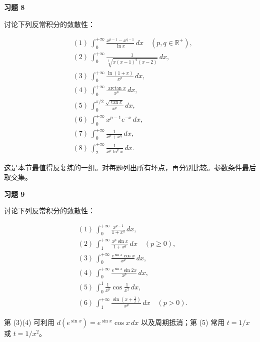 \begin{exercisebox}
\textbf{习题 8 }

讨论下列反常积分的敛散性：

\[
      \begin{aligned}
      &(1)\ \int_0^{+\infty}\frac{x^{p-1}-x^{q-1}}{\ln x}\,dx\quad(p,q\in\mathbb R^+),\\
      &(2)\ \int_0^{+\infty}\frac{1}{\sqrt[3]{x(x-1)^2(x-2)}}\,dx,\\
      &(3)\ \int_0^{+\infty}\frac{\ln(1+x)}{x^p}\,dx,\\
      &(4)\ \int_0^{+\infty}\frac{\arctan x}{x^p}\,dx,\\
      &(5)\ \int_0^{\pi/2}\frac{\sqrt{\tan x}}{x^p}\,dx,\\
      &(6)\ \int_0^{+\infty}x^{p-1}e^{-x}\,dx,\\
      &(7)\ \int_0^{+\infty}\frac{1}{x^p+x^q}\,dx,\\
      &(8)\ \int_2^{+\infty}\frac{1}{x^p\ln^q x}\,dx.
      \end{aligned}
      \]

\begin{hintbox}
这是本节最值得反复练的一组。对每题列出所有坏点，再分别比较。参数条件最后取交集。
\end{hintbox}
\end{exercisebox}

\begin{exercisebox}
\textbf{习题 9 }

讨论下列反常积分的敛散性：

\[
      \begin{aligned}
      &(1)\ \int_0^{+\infty}\frac{x^{p-1}}{1+x^q}\,dx,\\
      &(2)\ \int_1^{+\infty}\frac{x^p\sin x}{1+x^q}\,dx\quad(p\ge0),\\
      &(3)\ \int_0^{+\infty}\frac{e^{\sin x}\cos x}{x^p}\,dx,\\
      &(4)\ \int_0^{+\infty}\frac{e^{\sin x}\sin 2x}{x^p}\,dx,\\
      &(5)\ \int_0^1\frac{1}{x^p}\cos\frac{1}{x^2}\,dx,\\
      &(6)\ \int_1^{+\infty}\frac{\sin\left(x+\frac1x\right)}{x^p}\,dx\quad(p>0).
      \end{aligned}
      \]

\begin{hintbox}
第 (3)(4) 可利用 \(d(e^{\sin x})=e^{\sin x}\cos x\,dx\) 以及周期抵消；第 (5) 常用 \(t=1/x\) 或 \(t=1/x^2\)。
\end{hintbox}
\end{exercisebox}


